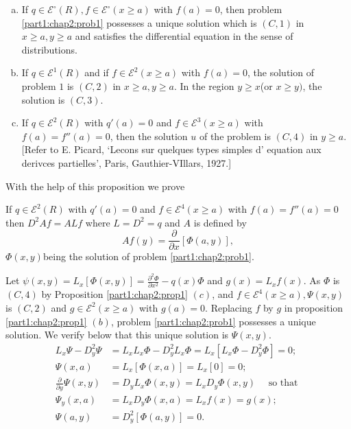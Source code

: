 \begin{proposition}\label{part1:chap2:prop1} %
  \begin{enumerate}[(a)]
  \item If $q \in \mathscr{E}^\circ(R), f \in \mathscr{E}^\circ (x \geq a)$
    with $f(a) =0$, then problem \ref{part1:chap2:prob1} possesses a unique solution which
    is  $(C, 1)$ in $x \geq a, y \geq a$ and satisfies the
    differential equation in the sense of distributions. 
  \item If $q \in \mathscr{E}^1(R)$ and if $f \in \mathscr{E}^2(x \geq
    a)$ with $f(a) =0$, the solution of problem $1$ is $(C, 2)$ in $x
    \geq a, y \geq a$. In the region $y \geq x $(or $x \geq y)$, the
    solution is $(C,3)$. 
  \item If $q \in \mathscr{E}^2 (R)$ with $q' (a) =0$ and $f \in
    \mathscr{E}^3(x \geq a)$ with $f(a) = f''(a) = 0$, then the
    solution $u$ of the problem is $(C, 4)$ in $y \geq a$. [Refer to
      E. Picard, `Lecons sur quelques types simples d' equation aux
      derivces partielles', Paris, Gauthier-VIllars, 1927.] 
  \end{enumerate}
\end{proposition}

With the help of this proposition we prove 
\begin{proposition}\label{part1:chap2:prop2} %
  If $q \in \mathscr{E}^2 (R)$ with $q'(a)=0$ and $f \in \mathscr{E}^4
  (x \geq a)$ with $f(a) = f''(a) =0$ then $D^2 Af = ALf$ where $L =
  D^2 = q$ and $A$ is defined by  
  $$
  Af(y) = \frac{\partial}{\partial x} [ \Phi (a,y) ],
  $$
  $\Phi (x,y)$\pageoriginale being the solution of
  problem \ref{part1:chap2:prob1}. 
\end{proposition}

Let $\psi (x,y) = L_x [\Phi (x,y) ] = \frac{\partial^2 \Phi}{\partial
  x^2} - q(x) \Phi$ and $g(x) = L_x f(x)$. As $\Phi$ is $(C, 4)$ by
Proposition \ref{part1:chap2:prop1} $(c)$, and $f \in \mathscr{E}^4 (x \geq a), \Psi (x,y)$
is $(C, 2)$ and $g \in \mathscr{E}^2 (x \geq a )$ with $g (a)
=0$. Replacing $f$ by $g$ in proposition \ref{part1:chap2:prop1}
$(b)$, problem \ref{part1:chap2:prob1} possesses 
a unique solution. We verify below that this unique solution is $\Psi
(x,y)$. 
\begin{align*}
  L_x\Psi - D^2_y \Psi & = L_x L_x \Phi - D^2_y L_x \Phi = L_x[ L_x \Phi
    - D^2_y \Phi ]=0;\\ 
  \Psi (x,a) & = L_x [ \Phi (x,a)] = L_x [0]=0;\\
  \frac{\partial}{\partial y} \Psi (x,y)& = D_y L_x \Phi (x,y) = L_x
  D_y \Phi (x,y) \quad \text{ so that }\\ 
  \Psi_y (x,a) & = L_x D_y \Phi(x,a) = L_x f(x) = g(x);\\
  \Psi (a,y)& = D^2_y [ \Phi (a,y) ]=0.
\end{align*}

